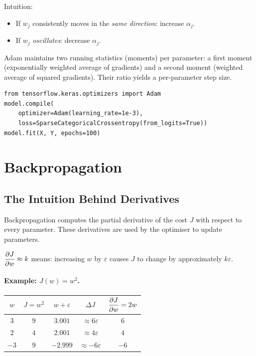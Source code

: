 Intuition:
\begin{itemize}
\item If $w_j$ consistently moves in the \emph{same direction}: increase $\alpha_j$.
\item If $w_j$ \emph{oscillates}: decrease $\alpha_j$.
\end{itemize}
Adam maintains two running statistics (moments) per parameter: a first moment
(exponentially weighted average of gradients) and a second moment (weighted
average of squared gradients). Their ratio yields a per-parameter step size.

\begin{lstlisting}[caption={Using Adam in TensorFlow}]
from tensorflow.keras.optimizers import Adam
model.compile(
    optimizer=Adam(learning_rate=1e-3),
    loss=SparseCategoricalCrossentropy(from_logits=True))
model.fit(X, Y, epochs=100)
\end{lstlisting}

\section{Backpropagation}
\label{sec:backprop}

\subsection{The Intuition Behind Derivatives}

Backpropagation computes the partial derivative of the cost $J$ with respect
to every parameter. These derivatives are used by the optimiser to update
parameters.

\begin{definition}
$\dfrac{\partial J}{\partial w}\approx k$ means: increasing $w$ by $\varepsilon$ causes $J$ to
change by approximately $k\varepsilon$.
\end{definition}

\paragraph{Example: $J(w)=w^2$.}
\begin{center}
\begin{tabular}{ccccc}
\toprule
$w$ & $J=w^2$ & $w+\varepsilon$ & $\Delta J$ & $\dfrac{\partial J}{\partial w}=2w$\\
\midrule
$3$  & $9$ & $3.001$ & $\approx 6\varepsilon$ & $6$\\
$2$  & $4$ & $2.001$ & $\approx 4\varepsilon$ & $4$\\
$-3$ & $9$ & $-2.999$ & $\approx -6\varepsilon$ & $-6$\\
\bottomrule
\end{tabular}
\end{center}

